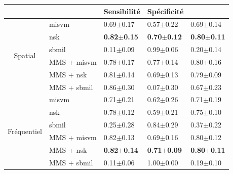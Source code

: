 \begin{table}[H]
    \centering
    \begin{tabular}{cllll}
        \toprule
        \multicolumn{1}{l}{}         &                          & Sensibilité           & Spécificité           & \fscore{}             \\ \midrule
        \multirow{6}{*}{Spatial}     & \gls{misvm}              & 0.69$\pm$0.17             & 0.57$\pm$0.22             & 0.69$\pm$0.14             \\
                                     & \gls{nsk}                & \textbf{0.82$\pm$0.15}    & \textbf{0.70$\pm$0.12}    & \textbf{0.80$\pm$0.11}    \\
                                     & \gls{sbmil}              & 0.11$\pm$0.09             & 0.99$\pm$0.06             & 0.20$\pm$0.14             \\
                                     & MMS + \gls{misvm}        & 0.78$\pm$0.17             & 0.77$\pm$0.14             & 0.80$\pm$0.16             \\
                                     & MMS + \gls{nsk}          & 0.81$\pm$0.14             & 0.69$\pm$0.13             & 0.79$\pm$0.09             \\
                                     & MMS + \gls{sbmil}        & 0.86$\pm$0.30             & 0.07$\pm$0.30             & 0.67$\pm$0.23             \\ \midrule
        \multirow{6}{*}{Fréquentiel} & \gls{misvm}              & 0.71$\pm$0.21             & 0.62$\pm$0.26             & 0.71$\pm$0.19             \\
                                     & \gls{nsk}                & 0.78$\pm$0.12             & 0.59$\pm$0.21             & 0.75$\pm$0.10             \\
                                     & \gls{sbmil}              & 0.25$\pm$0.28             & 0.84$\pm$0.29             & 0.37$\pm$0.22             \\
                                     & MMS + \gls{misvm}        & 0.82$\pm$0.13             & 0.69$\pm$0.16             & 0.80$\pm$0.12             \\
                                     & MMS + \gls{nsk}          & \textbf{0.82$\pm$0.14}    & \textbf{0.71$\pm$0.09}    & \textbf{0.80$\pm$0.11}    \\
                                     & MMS + \gls{sbmil}        & 0.11$\pm$0.06             & 1.00$\pm$0.00             & 0.19$\pm$0.10             \\ \midrule

\end{tabular}
\end{table}
